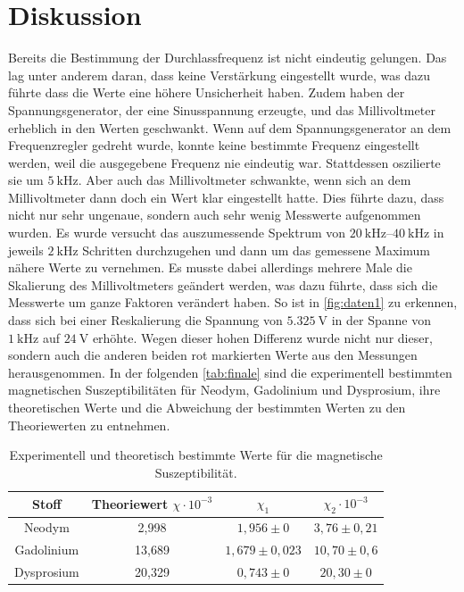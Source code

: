 \section{Diskussion}
\label{sec:Diskussion}
Bereits die Bestimmung der Durchlassfrequenz ist nicht eindeutig gelungen. Das lag unter anderem daran, dass keine Verstärkung eingestellt wurde, was dazu führte dass die Werte eine
höhere Unsicherheit haben. Zudem haben der Spannungsgenerator, der eine Sinusspannung erzeugte, und das Millivoltmeter erheblich in den Werten geschwankt. Wenn auf dem Spannungsgenerator an dem Frequenzregler gedreht wurde, 
konnte keine bestimmte Frequenz eingestellt werden, weil die ausgegebene Frequenz nie eindeutig war. Stattdessen oszilierte sie um $\SI{5}{\kilo\hertz}$.
Aber auch das Millivoltmeter schwankte, wenn sich an dem Millivoltmeter dann doch ein Wert klar eingestellt hatte. Dies führte dazu, dass nicht nur sehr ungenaue, sondern auch sehr wenig Messwerte aufgenommen wurden.
Es wurde versucht das auszumessende Spektrum von $\SIrange{20}{40}{\kilo\hertz}$ in jeweils $\SI{2}{\kilo\hertz}$ Schritten durchzugehen und dann um das gemessene Maximum nähere Werte zu vernehmen.
Es musste dabei allerdings mehrere Male die Skalierung des Millivoltmeters geändert werden, was dazu führte, dass sich die Messwerte um ganze Faktoren verändert haben. 
So ist in \autoref{fig:daten1} zu erkennen, dass sich bei einer Reskalierung die Spannung von $\SI{5,325}{\volt}$ in der Spanne von $\SI{1}{\kilo\hertz}$ auf $\SI{24}{\volt}$ erhöhte.
Wegen dieser hohen Differenz wurde nicht nur dieser, sondern auch die anderen beiden rot markierten Werte aus den Messungen herausgenommen. 
In der folgenden \autoref{tab:finale} sind die experimentell bestimmten magnetischen Suszeptibilitäten für Neodym, Gadolinium und Dysprosium, ihre theoretischen Werte und die Abweichung der bestimmten Werten zu den Theoriewerten zu entnehmen.
\begin{table}[H]
    \centering
    \caption{Experimentell und theoretisch bestimmte Werte für die magnetische Suszeptibilität.}
    \label{tab:finale}
    \begin{tabular}{c| c c c}
        \toprule
        Stoff & Theoriewert $\chi \cdot 10^{-3} $ & $\chi_1$ & $\chi_2  \cdot 10^{-3}$ \\
        \midrule
        Neodym & 2,998 & $1,956 \pm 0$ & $3,76 \pm 0,21$ \\
        Gadolinium & 13,689 & $1,679 \pm 0,023$ & $10,70 \pm 0,6$ \\
        Dysprosium & 20,329 &$0,743 \pm 0$ & $20,30 \pm 0$ \\
      \bottomrule
    \end{tabular}
\end{table}

